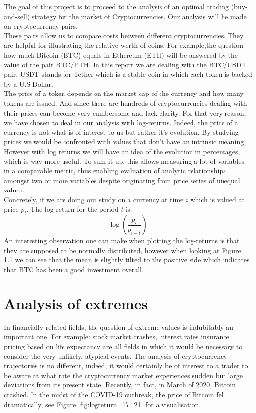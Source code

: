 \documentclass[twoside]{report}
\begin{document}
\begin{spacing}{1}
The goal of this project is to proceed to the analysis of an optimal trading (buy-and-sell) strategy for the market of Cryptocurrencies. Our analysis will be made on cryptocurrency pairs.\\
These pairs allow us to compare costs between different cryptocurrencies. They are helpful for illustrating the relative worth of coins. For example,the question how much Bitcoin (BTC) equals in Ethereum (ETH) will be answered by the value of the pair BTC/ETH.
In this report we are dealing with the BTC/USDT pair. USDT stands for Tether which is a stable coin in which each token is backed by a U.S Dollar.\\
The price of a token depends on the market cap of the currency and how many tokens are issued. And since there are hundreds of cryptocurrencies dealing with their prices can become very cumbersome and lack clarity. For that very reason, we have chosen to deal in our analysis with log-returns.
Indeed, the price of a currency is not what is of interest to us but rather it's evolution. By studying prices we would be confronted with values that don't have an intrinsic meaning, However with log returns we will have an idea of the evolution in percentages, which is way more useful. To sum it up, this allows measuring a lot of variables in a comparable metric, thus enabling evaluation of analytic relationships amongst two or more variables despite originating from price series of unequal values. \\
Concretely, if we are doing our study on a currency at time $i$ which is valued at price $p_i$. The log-return for the period $t$ is:
$$\log(\frac{p_i}{p_{i-t}})$$
 An interesting observation one can make when plotting the log-returns is that they are supposed to be normally distributed, however when looking at Figure 1.1 we can see that the mean is slightly tilted to the positive side which indicates that BTC has been a good investment overall.
 

\section{Analysis of extremes}

In financially related fields, the question of extreme values is indubitably an important one. For example: stock market crashes, interest rates  insurance pricing based on life expectancy are all fields in which it would be necessary to consider the very unlikely, atypical events. The analysis of cryptocurrency trajectories is no different, indeed, it would certainly be of interest to a trader to be aware at what rate the cryptocurrency market experiences sudden but large deviations from its present state. Recently, in fact, in March of $2020$, Bitcoin crashed. In the midst of the COVID-19 outbreak, the price of Bitcoin fell dramatically, see Figure \ref{fig:logreturn_17_21} for a visualisation.




\end{spacing}
\end{document}
